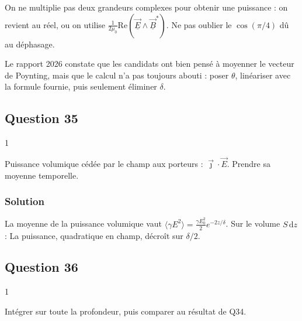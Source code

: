 \documentclass[11pt,a4paper]{article}
\newcommand{\equationajustee}[1]{%
  \sbox{\boiteequation}{$\displaystyle #1$}%
  \ifdim\wd\boiteequation>\linewidth
    \[\resizebox{\linewidth}{!}{\usebox{\boiteequation}}\]%
  \else
    \[#1\]%
  \fi}
\begin{document}
\begin{piege}

On ne multiplie pas deux grandeurs complexes pour obtenir une puissance : on revient au réel, ou on utilise \(\frac1{2\mu_0}\mathrm{Re}(\underline{\vec E}\wedge\underline{\vec B}^*)\). Ne pas oublier le \(\cos(\pi/4)\) dû au déphasage.

\end{piege}

\begin{jury}

Le rapport 2026 constate que les candidats ont bien pensé à moyenner le vecteur de Poynting, mais que le calcul n'a pas toujours abouti : poser \(\theta\), linéariser avec la formule fournie, puis seulement éliminer \(\delta\).

\end{jury}

\hypertarget{question-35}{%
\subsection{Question 35}\label{question-35}}

\begin{indication}{1}

Puissance volumique cédée par le champ aux porteurs : \(\vec\jmath\cdot\vec E\). Prendre sa moyenne temporelle.

\end{indication}

\hypertarget{solution-34}{%
\subsubsection{Solution}\label{solution-34}}

La moyenne de la puissance volumique vaut \(\langle\gamma E^2\rangle=\frac{\gamma E_0^2}2e^{-2z/\delta}\). Sur le volume \(S\,\mathrm dz\) :
\equationajustee{\boxed{\mathrm d\mathcal P_J=\frac{\gamma E_0^2S}2e^{-2z/\delta}\,\mathrm dz}}
La puissance, quadratique en champ, décroît sur \(\delta/2\).

\hypertarget{question-36}{%
\subsection{Question 36}\label{question-36}}

\begin{indication}{1}

Intégrer sur toute la profondeur, puis comparer au résultat de Q34.

\end{indication}
\end{document}
